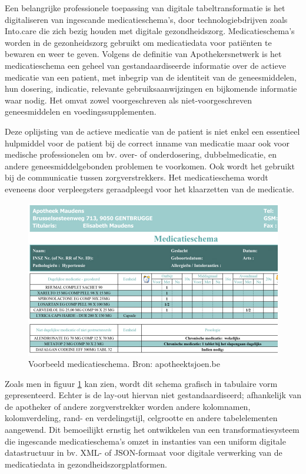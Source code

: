 Een belangrijke professionele toepassing van digitale tabeltransformatie is het digitaliseren van ingescande medicatieschema’s, door technologiebdrijven zoals Into.care die zich bezig houden met digitale gezondheidszorg. Medicatieschema's worden in de gezonheidszorg gebruikt om medicatiedata voor patiënten te bewaren en weer te geven. Volgens de definitie van Apothekersnetwerk \autocite{ApothekersNetwerk2013} is het medicatieschema een geheel van gestandaardiseerde informatie over de actieve medicatie van een patient, met inbegrip van de identiteit van de geneesmiddelen, hun dosering, indicatie, relevante gebruiksaanwijzingen en bijkomende informatie waar nodig. Het omvat zowel voorgeschreven als niet-voorgeschreven geneesmiddelen en voedingssupplementen.

Deze oplijsting van de actieve medicatie van de patient is niet enkel een essentieel hulpmiddel voor de patient bij de correct inname van medicatie maar ook voor medische professionelen om bv. over- of onderdosering, dubbelmedicatie, en andere geneesmiddelgebonden problemen te voorkomen. Ook wordt het gebruikt bij de communicatie tussen zorgverstrekkers. Het medicatieschema wordt eveneens door verpleegsters geraadpleegd voor het klaarzetten van de medicatie.

\begin{figure}[h]
    \centering
    \includegraphics[width=1\textwidth]{img/voorbeeld_medicatieschema.jpg}
    \caption{Voorbeeld medicatieschema. Bron: apotheektsjoen.be}
    \label{fig:voorbeeld_medicatieschema}
\end{figure}

Zoals men in figuur \ref{fig:voorbeeld_medicatieschema} kan zien, wordt dit schema grafisch in tabulaire vorm gepresenteerd. Echter is de lay-out hiervan niet gestandaardiseerd; afhankelijk van de apotheker of andere zorgverstrekker worden andere kolomnamen, kolomverdeling, rand- en verdelingstijl, celgrootte en andere tabelelementen aangewend. Dit bemoeilijkt ernstig het ontwikkelen van een transformatiesysteem die ingescande medicatieschema’s omzet in instanties van een uniform digitale datastructuur in bv. XML- of JSON-formaat voor digitale verwerking van de medicatiedata in gezondheidszorgplatformen.

